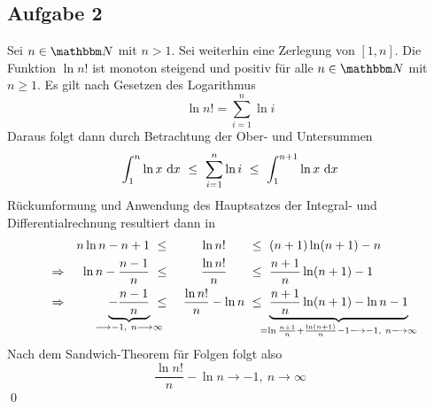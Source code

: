 \subsection*{Aufgabe 2} %
\label{sub:aufgabe_2}

	Sei $n\in\SN$ mit $n>1$.
	Sei weiterhin  eine Zerlegung von $[1,n]$.
	Die Funktion $\ln n!$ ist monoton steigend und positiv für alle $n\in\SN$ mit $n\geq 1$.
	Es gilt nach Gesetzen des Logarithmus
	\[ \ln n! = \sum_{i=1}^{n}\ln{i} \]
	Daraus folgt dann durch Betrachtung der Ober- und Untersummen
	\[ \int_{1}^{n} \ln x\ \mathrm{d} x \ \leq \ \sum_{i=1}^n \ln i \ \leq \ \int_{1}^{n+1} \ln x\ \mathrm{d} x \]
	Rückumformung und Anwendung des Hauptsatzes der Integral- und Differentialrechnung resultiert dann in
	\begin{alignat}{6}
		&&n\ln n - n+1 \ \leq && \centermathcell{\ln n!} &\leq \ (n+1)\ln(n+1) -n \nonumber \\
		\Rightarrow &&\ln n -\frac{n-1}{n} \ \leq &&\centermathcell{\frac{\ln n!}{n}} &\leq \ \frac{n+1}{n}\ln(n+1) - 1 \nonumber \\
		\Rightarrow &&\underbrace{-\frac{n-1}{n}}_{\mathclap{\longrightarrow -1,\ n \longrightarrow \infty}} \ \leq &&\centermathcell{\ \frac{\ln n!}{n} - \ln n} \ &\leq \ \underbrace{\frac{n+1}{n}\ln(n+1) -\ln n - 1}_{\mathclap{= \ln\frac{n+1}{n} + \frac{\ln(n+1)}{n} - 1 \longrightarrow -1,\ n \longrightarrow \infty}} \nonumber
	\end{alignat}
	Nach dem Sandwich-Theorem für Folgen folgt also
	\[ \frac{\ln n!}{n} - \ln n  \longrightarrow -1,\ n \longrightarrow \infty \]
	\qed

